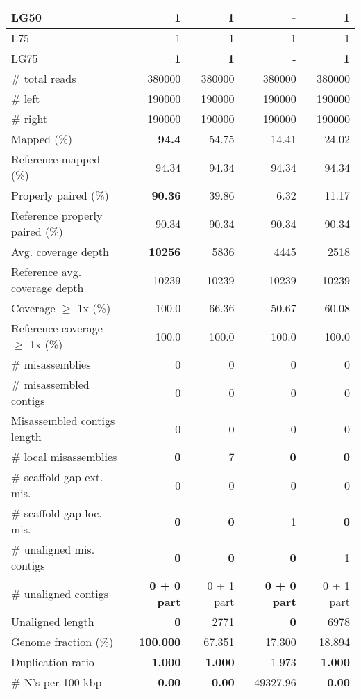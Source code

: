 \documentclass[12pt,a4paper]{article}
\begin{document}
\begin{table}[ht]
\begin{center}
\begin{tabular}{|l*{4}{|r}|}
LG50 & {\bf 1} & {\bf 1} & - & {\bf 1} \\ \hline
L75 & 1 & 1 & 1 & 1 \\ \hline
LG75 & {\bf 1} & {\bf 1} & - & {\bf 1} \\ \hline
\# total reads & 380000 & 380000 & 380000 & 380000 \\ \hline
\# left & 190000 & 190000 & 190000 & 190000 \\ \hline
\# right & 190000 & 190000 & 190000 & 190000 \\ \hline
Mapped (\%) & {\bf 94.4} & 54.75 & 14.41 & 24.02 \\ \hline
Reference mapped (\%) & 94.34 & 94.34 & 94.34 & 94.34 \\ \hline
Properly paired (\%) & {\bf 90.36} & 39.86 & 6.32 & 11.17 \\ \hline
Reference properly paired (\%) & 90.34 & 90.34 & 90.34 & 90.34 \\ \hline
Avg. coverage depth & {\bf 10256} & 5836 & 4445 & 2518 \\ \hline
Reference avg. coverage depth & 10239 & 10239 & 10239 & 10239 \\ \hline
Coverage $\geq$ 1x (\%) & 100.0 & 66.36 & 50.67 & 60.08 \\ \hline
Reference coverage $\geq$ 1x (\%) & 100.0 & 100.0 & 100.0 & 100.0 \\ \hline
\# misassemblies & 0 & 0 & 0 & 0 \\ \hline
\# misassembled contigs & 0 & 0 & 0 & 0 \\ \hline
Misassembled contigs length & 0 & 0 & 0 & 0 \\ \hline
\# local misassemblies & {\bf 0} & 7 & {\bf 0} & {\bf 0} \\ \hline
\# scaffold gap ext. mis. & 0 & 0 & 0 & 0 \\ \hline
\# scaffold gap loc. mis. & {\bf 0} & {\bf 0} & 1 & {\bf 0} \\ \hline
\# unaligned mis. contigs & {\bf 0} & {\bf 0} & {\bf 0} & 1 \\ \hline
\# unaligned contigs & {\bf 0 + 0 part} & 0 + 1 part & {\bf 0 + 0 part} & 0 + 1 part \\ \hline
Unaligned length & {\bf 0} & 2771 & {\bf 0} & 6978 \\ \hline
Genome fraction (\%) & {\bf 100.000} & 67.351 & 17.300 & 18.894 \\ \hline
Duplication ratio & {\bf 1.000} & {\bf 1.000} & 1.973 & {\bf 1.000} \\ \hline
\# N's per 100 kbp & {\bf 0.00} & {\bf 0.00} & 49327.96 & {\bf 0.00} \\ \hline

\end{tabular}
\end{center}
\end{table}
\end{document}
